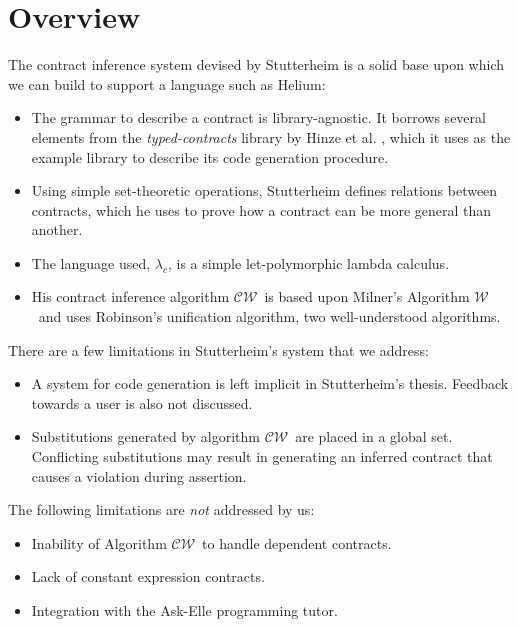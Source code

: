 \documentclass[10pt]{report}
\newcommand{\W}{$\mathcal{W}$}
\newcommand{\CW}{$\mathcal{CW}$}
\begin{document}
\chapter{Overview}
\label{chapter-overview}

The contract inference system devised by Stutterheim is a solid base upon which we can build to support a language such as Helium:

\begin{itemize}
	\item The grammar to describe a contract is library-agnostic. It borrows several elements from the \textit{typed-contracts} library by Hinze et al. \cite{Hinze06typedcontracts}, which it uses as the example library to describe its code generation procedure.
	\item Using simple set-theoretic operations, Stutterheim defines relations between contracts, which he uses to prove how a contract can be more general than another.
	\item The language used, $\lambda_c$, is a simple let-polymorphic lambda calculus.
	\item His contract inference algorithm \CW ~is based upon Milner's Algorithm \W ~and uses Robinson's unification algorithm, two well-understood algorithms.
\end{itemize}

There are a few limitations in Stutterheim's system that we address:

\begin{itemize}
	\item A system for code generation is left implicit in Stutterheim's thesis. Feedback towards a user is also not discussed.
	\item Substitutions generated by algorithm \CW ~are placed in a global set. Conflicting substitutions may result in generating an inferred contract that causes a violation during assertion.
\end{itemize}

The following limitations are \textit{not} addressed by us:

\begin{itemize}
	\item Inability of Algorithm \CW ~to handle dependent contracts.
	\item Lack of constant expression contracts.
	\item Integration with the Ask-Elle programming tutor.
\end{itemize}
\end{document}
